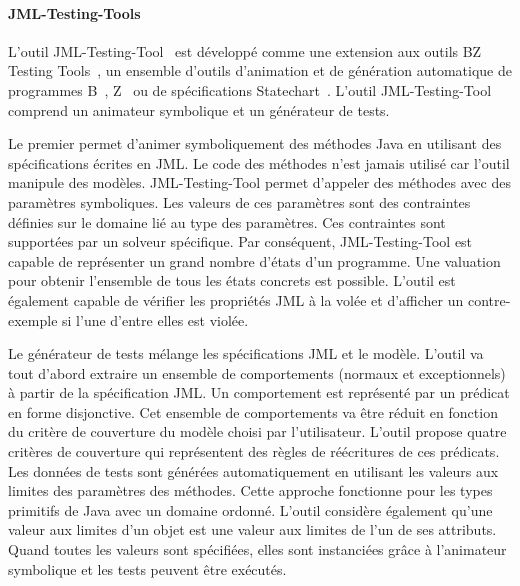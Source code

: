 \paragraph{JML-Testing-Tools} L'outil JML-Testing-Tool~ est développé comme une extension aux outils BZ Testing
Tools~, un ensemble d'outils d'animation et de génération
automatique de programmes B~, Z~ ou de
spécifications Statechart~. L'outil JML-Testing-Tool comprend un
animateur symbolique et un générateur de tests.

Le premier permet d'animer symboliquement des méthodes Java en utilisant des
spécifications écrites en JML. Le code des méthodes n'est jamais utilisé car
l'outil manipule des modèles. JML-Testing-Tool permet d'appeler des méthodes
avec des paramètres symboliques. Les valeurs de ces paramètres sont des
contraintes définies sur le domaine lié au type des paramètres. Ces contraintes
sont supportées par un solveur spécifique. Par conséquent, JML-Testing-Tool est
capable de représenter un grand nombre d'états d'un programme. Une valuation
pour obtenir l'ensemble de tous les états concrets est possible. L'outil est
également capable de vérifier les propriétés JML à la volée et d'afficher un
contre-exemple si l'une d'entre elles est violée.

Le générateur de tests mélange les spécifications JML et le modèle. L'outil va
tout d'abord extraire un ensemble de comportements (normaux et exceptionnels) à
partir de la spécification JML. Un comportement est représenté par un prédicat
en forme disjonctive. Cet ensemble de comportements va être réduit en fonction
du critère de couverture du modèle choisi par l'utilisateur. L'outil propose
quatre critères de couverture qui représentent des règles de réécritures de ces
prédicats. Les données de tests sont générées automatiquement en utilisant les
valeurs aux limites des paramètres des méthodes. Cette approche fonctionne pour
les types primitifs de Java avec un domaine ordonné. L'outil considère également
qu'une valeur aux limites d'un objet est une valeur aux limites de l'un de ses
attributs. Quand toutes les valeurs sont spécifiées, elles sont instanciées
grâce à l'animateur symbolique et les tests peuvent être exécutés.

